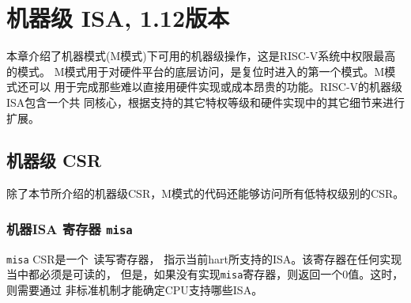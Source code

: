 \chapter{机器级 ISA, 1.12版本}
\label{machine}
\iffalse
This chapter describes the machine-level operations available in
machine-mode (M-mode), which is the highest privilege mode in a RISC-V
system.  M-mode is used for low-level access to a
hardware platform and is the first mode entered at reset.  M-mode can
also be used to implement features that are too difficult or expensive
to implement in hardware directly.  The RISC-V machine-level ISA
contains a common core that is extended depending on which other
privilege levels are supported and other details of the hardware
implementation.
\fi
本章介绍了机器模式(M模式)下可用的机器级操作，这是RISC-V系统中权限最高的模式。
M模式用于对硬件平台的底层访问，是复位时进入的第一个模式。M模式还可以
用于完成那些难以直接用硬件实现或成本昂贵的功能。RISC-V的机器级ISA包含一个共
同核心，根据支持的其它特权等级和硬件实现中的其它细节来进行扩展。

\section{机器级 CSR}

\iffalse
In addition to the machine-level CSRs described in this section,
M-mode code can access all CSRs at lower privilege levels.
\fi
除了本节所介绍的机器级CSR，M模式的代码还能够访问所有低特权级别的CSR。 

\subsection{机器ISA 寄存器 {\tt misa}}
\label{sec:misa}

\iffalse
The {\tt misa} CSR is a \warl\ read-write register
reporting the ISA supported by the hart.  This register must be
readable in any implementation, but a value of zero can be returned to
indicate the {\tt misa} register has not been implemented, requiring
that CPU capabilities be determined through a separate non-standard
mechanism.
\fi
{\tt misa} CSR是一个\warl\ 读写寄存器，
指示当前hart所支持的ISA。该寄存器在任何实现当中都必须是可读的，
但是，如果没有实现{\tt misa}寄存器，则返回一个0值。这时，则需要通过
非标准机制才能确定CPU支持哪些ISA。

